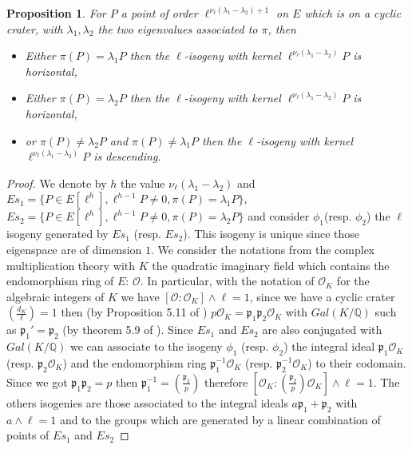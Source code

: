 \documentclass{article}
\theoremstyle{plain}
\newtheorem{prop}[thm]{Proposition}
\theoremstyle{definition}
\theoremstyle{remark}
\begin{document}
\begin{prop} \label{conjecture}
For $P$ a point of order $\ell^{\nu_{\ell}(\lambda_1-\lambda_2)+1}$ on $E$ which is on a cyclic crater, with $\lambda_1, \lambda_2$ the two eigenvalues associated to $\pi$, then
\begin{itemize}
\item Either $\pi(P)=\lambda_1P$ then the $\ell$-isogeny with kernel $\ell^{\nu_{\ell}(\lambda_1-\lambda_2)} P$ is horizontal,
\item Either $\pi(P)=\lambda_2P$ then the $\ell$-isogeny with kernel $\ell^{\nu_{\ell}(\lambda_1-\lambda_2)} P$ is horizontal,
\item or $\pi(P) \neq \lambda_2P$ and $\pi(P) \neq \lambda_1P$ then the $\ell$-isogeny with kernel $\ell^{\nu_{\ell}(\lambda_1-\lambda_2)} P$ is descending.
\end{itemize} 
\end{prop}

\begin{proof}
We denote by $h$ the value $\nu_{\ell}(\lambda_1-\lambda_2)$ and  $Es_1=\{P \in E[\ell^h], \ell^{h-1}P \neq 0, \pi(P)=\lambda_1P\}$, $Es_2=\{P \in E[\ell^h], \ell^{h-1}P \neq 0, \pi(P)=\lambda_2P\}$ and consider $\phi_1$(resp. $\phi_2$) the $\ell$isogeny generated by $Es_1$ (resp. $Es_2$). This isogeny is unique since those eigenspace are of dimension $1$. %
We consider the notations from the complex multiplication theory with $K$ the quadratic imaginary field which contains the endomorphism ring of $E$: $\mathcal{O}$. In particular, with the notation of $\mathcal{O}_K$ for the algebraic integers of $K$ we have $[\mathcal{O}:\mathcal{O}_K]\wedge \ell =1$, since we have a cyclic crater $\left( \frac{d_K}{\ell} \right)=1$ then (by Proposition 5.11 of \cite{Cox89} )  $p\mathcal{O}_K=\mathfrak{p}_1\mathfrak{p}_2\mathcal{O}_K$ with $Gal(K/\mathbb{Q})$ such as $\mathfrak{p}_1'=\mathfrak{p}_2$ (by theorem 5.9 of \cite{Cox89}). Since $Es_1$ and $Es_2$ are also conjugated with $Gal(K/\mathbb{Q})$ we can associate to the isogeny $\phi_1$ (resp. $\phi_2$)  the integral ideal $\mathfrak{p}_1\mathcal{O}_K$ (resp. $\mathfrak{p}_2\mathcal{O}_K$) and the endomorphism ring $\mathfrak{p}_1^{-1}\mathcal{O}_K$ (resp. $\mathfrak{p}_2^{-1}\mathcal{O}_K$) to their codomain. Since we got $\mathfrak{p}_1\mathfrak{p}_2=p$ then $\mathfrak{p}_1^{-1}=\left( \frac{\mathfrak{p}_2}{p} \right)$ therefore $[\mathcal{O}_K:\left( \frac{\mathfrak{p}_2}{p} \right)\mathcal{O}_K]\wedge \ell =1$. The others isogenies are those associated to the integral ideals $a  \mathfrak{p}_1 + \mathfrak{p}_2$ with $a \wedge \ell =1$ and to the groups which are generated by a linear combination of points of $Es_1$ and $Es_2$
\end{proof}
\end{document}
